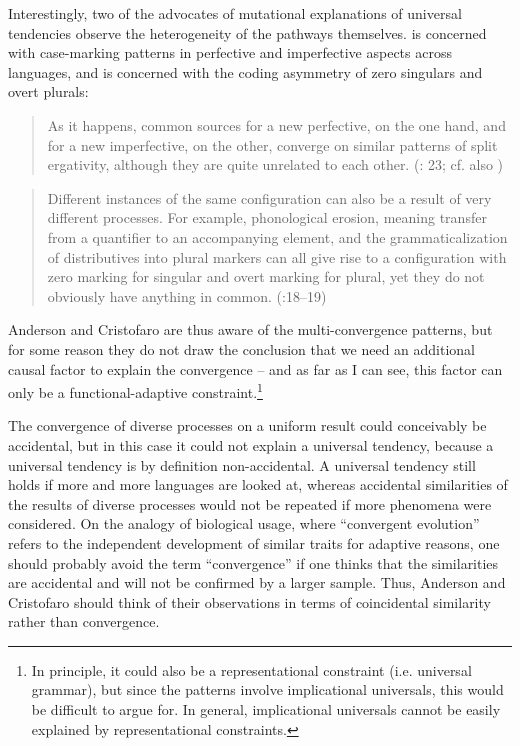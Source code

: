 \documentclass[output=paper]{langsci/langscibook}
\begin{document}
Interestingly, two of the advocates of mutational explanations of universal tendencies observe the heterogeneity of the pathways themselves. \citet{Anderson2016} is concerned with case-marking patterns in perfective and imperfective aspects across languages, and \citet{Cristofaro2017} is concerned with the coding asymmetry of zero singulars and overt plurals:

\begin{quote}
As it happens, common sources for a new perfective, on the one hand, and for a new imperfective, on the other, converge on similar patterns of split ergativity, although they are quite unrelated to each other. (\citealt{Anderson2016}: 23; cf. also \citealt{Anderson1977})
\end{quote}

\begin{quote}
Different instances of the same configuration can also be a result of very different processes. For example, phonological erosion, meaning transfer from a quantifier to an accompanying element, and the grammaticalization of distributives into plural markers can all give rise to a configuration with zero marking for singular and overt marking for plural, yet they do not obviously have anything in common. (\citealt{Cristofaro2017}:18–19)
\end{quote}

Anderson and Cristofaro are thus aware of the multi-convergence patterns, but for some reason they do not draw the conclusion that we need an additional causal factor to explain the convergence – and as far as I can see, this factor can only be a functional-adaptive constraint.\footnote{In principle, it could also be a representational constraint (i.e. universal grammar), but since the patterns involve implicational universals, this would be difficult to argue for. In general, implicational universals cannot be easily explained by representational constraints.}

The convergence of diverse processes on a uniform result could conceivably be accidental, but in this case it could not explain a universal tendency, because a universal tendency is by definition non-accidental. A universal tendency still holds if more and more languages are looked at, whereas accidental similarities of the results of diverse processes would not be repeated if more phenomena were considered. On the analogy of biological usage, where “convergent evolution” refers to the independent development of similar traits for adaptive reasons, one should probably avoid the term “convergence” if one thinks that the similarities are accidental and will not be confirmed by a larger sample. Thus, Anderson and Cristofaro should think of their observations in terms of coincidental similarity rather than convergence.
\end{document}
